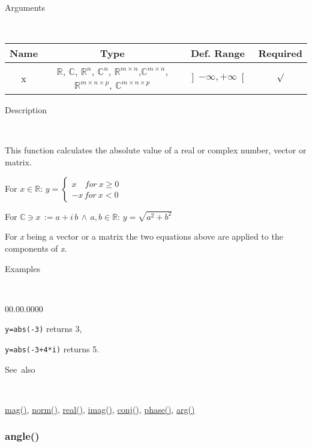 \begin{description}
\item [Arguments]~
\end{description}
\begin{tabular}{|c|c|c|c|}
\hline 
Name&
Type&
Def. Range&
Required\tabularnewline
\hline
\hline 
x&
$\mathbb{R}$, $\mathbb{C}$, $\mathbb{R}^{n}$, $\mathbb{C}^{n}$,
$\mathbb{\mathbb{R}}^{m\times n}$,$\mathbb{\mathbb{C}}^{m\times n}$,
$\mathbb{\mathbb{R}}^{m\times n\times p}$, $\mathbb{\mathbb{C}}^{m\times n\times p}$ &
$\left]-\infty,+\infty\right[$&
$\surd$\tabularnewline
\hline
\end{tabular}

\begin{description}
\item [Description]~
\end{description}
This function calculates the absolute value of a real or complex number,
vector or matrix.

\medskip{}
For $x\in\mathbb{R}$: $y=\left\{ \begin{array}{l}
x\quad for\: x\geq0\\
-x\, for\: x<0\end{array}\right.$
\medskip{}

For $\mathbb{\mathbb{C}}\ni x\,:=a+i\, b\,\wedge\, a,b\in\mathbb{R}$:
$y=\sqrt{a^{2}+b^{2}}$
\medskip{}

For \textit{x} being a vector or a matrix the two equations above
are applied to the components of \textit{x}.

\begin{description}
\item [Examples]~
\end{description}
\begin{lyxlist}{00.00.0000}
\item [\texttt{y=abs(-3)}]returns 3,
\item [\texttt{y=abs(-3+4{*}i)}]returns 5.
\end{lyxlist}
\begin{description}
\item [See~also]~
\end{description}
\textcolor{blue}{\hyperlink{mag}{mag()}}, \textcolor{blue}{\hyperlink{norm}{norm()}},
\textcolor{blue}{\hyperlink{real}{real()}}, \textcolor{blue}{\hyperlink{imag}{imag()}},
\textcolor{blue}{\hyperlink{conj}{conj()}}, \textcolor{blue}{\hyperlink{phase}{phase()}},
\textcolor{blue}{\hyperlink{arg}{arg()}}


\newpage
\subsubsection*{\hypertarget{angle}{}{\Large angle()}}


